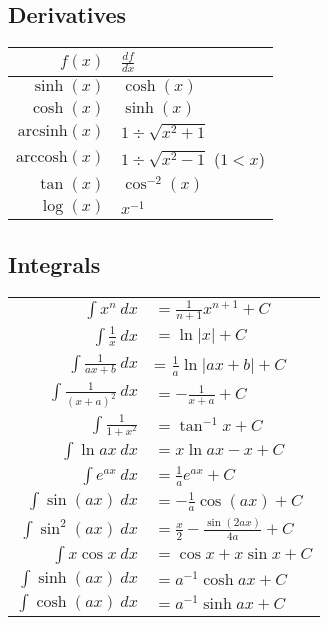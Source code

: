 \subsection{Derivatives}
\begin{tabular}{r|l}
    $f(x)$                & $\frac{df}{dx}$                 \\
    \hline
    $\sinh(x)$            & $\cosh(x)$                      \\
    $\cosh(x)$            & $\sinh(x)$                      \\
    $\mathrm{arcsinh}(x)$ & $1 \div \sqrt{x^2+1}$           \\
    $\mathrm{arccosh}(x)$ & $1 \div \sqrt{x^2 - 1}$ ($1<x$) \\
    $\tan(x)$             & $\cos^{-2}(x)$                  \\
    $\log(x)$             & $x^{-1}$
\end{tabular}

\subsection{Integrals}
\begin{tabular}[h]{rl}
    $\int x^n\ dx$               & $= \frac{1}{n+1}x^{n+1} + C$             \\
    $\int \frac{1}{x}\ dx$       & $= \ln |x| + C$                          \\
    $\int \frac{1}{ax + b}\ dx$  & = $\frac{1}{a} \ln |ax+b| + C$           \\
    $\int \frac{1}{(x+a)^2}\ dx$ & $= -\frac{1}{x+a} + C$                   \\
    $\int \frac{1}{1 + x^2}$     & $= \tan^{-1} x + C$                      \\
    $\int \ln ax\ dx$            & $= x\ln ax - x + C$                      \\
    $\int e^{ax}\ dx$            & $= \frac{1}{a} e^{ax} + C$               \\
    $\int \sin(ax)\ dx$          & $= -\frac{1}{a}\cos(ax) + C$             \\
    $\int \sin^2(ax)\ dx$        & $= \frac{x}{2}-\frac{\sin(2ax)}{4a} + C$ \\
    $\int x\cos x\ dx$           & $= \cos x + x\sin x + C$                 \\
    $\int \sinh(ax)\ dx$         & $= a^{-1}\cosh{ax} + C$                  \\
    $\int \cosh(ax)\ dx$         & $= a^{-1}\sinh{ax} + C$                  \\
\end{tabular}

